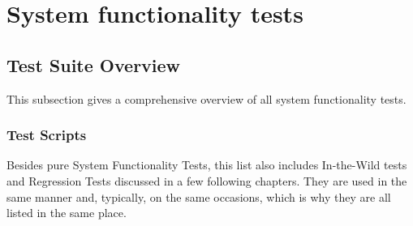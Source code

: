 
\section{System functionality tests}
\label{s:functionality}

\subsection{Test Suite Overview}

This subsection gives a comprehensive overview of all system functionality tests.

\subsubsection{Test Scripts}

Besides pure System Functionality Tests, this list also includes In-the-Wild tests and Regression Tests discussed in a few following chapters. They are used in the same manner and, typically, on the same occasions, which is why they are all listed in the same place. 

